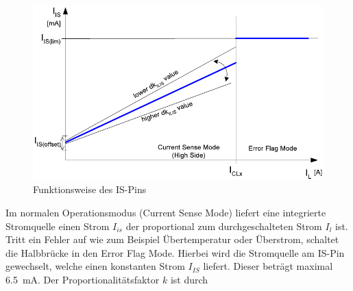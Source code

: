 \begin{figure} [H]
	\centering
	\includegraphics[width=0.7\linewidth]{Bilder/IS_Pin.pdf}
	\caption{Funktionsweise des IS-Pins}
	\label{fig:IS_Pin}
\end{figure}\noindent
Im normalen Operationsmodus (Current Sense Mode) liefert eine integrierte Stromquelle einen Strom $I_{is}$ der proportional zum durchgeschalteten Strom $I_{l}$ ist. Tritt ein Fehler auf wie zum Beispiel Übertemperatur oder Überstrom, schaltet die Halbbrücke in den Error Flag Mode. Hierbei wird die Stromquelle am IS-Pin gewechselt, welche einen konstanten Strom $I_{IS}$ liefert.  Dieser beträgt maximal \SI{6,5}{mA}. Der Proportionalitätsfaktor $k$ ist durch

